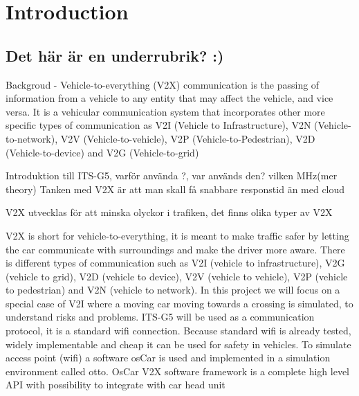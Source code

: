 \section{Introduction}
\subsection{Det här är en underrubrik? :)}
Backgroud - Vehicle-to-everything (V2X) communication is the passing of information from
a vehicle to any entity that may affect the vehicle, and vice versa. It is a vehicular
communication system that incorporates other more specific types of communication as 
V2I (Vehicle to Infrastructure), V2N (Vehicle-to-network), V2V (Vehicle-to-vehicle), V2P (Vehicle-to-Pedestrian), V2D (Vehicle-to-device) and V2G (Vehicle-to-grid) 

Introduktion till ITS-G5, varför använda ?, var används den? vilken MHz(mer theory)
Tanken med V2X är att man skall få snabbare responstid än med cloud 

V2X utvecklas för att minska olyckor i trafiken, det finns olika typer av V2X\bigskip



V2X is short for vehicle-to-everything, it is meant to make traffic safer by letting the car communicate with surroundings and make the driver more aware. There is different types of communication such as V2I (vehicle to infrastructure), V2G (vehicle to grid), V2D (vehicle to device), V2V (vehicle to vehicle), V2P (vehicle to pedestrian) and V2N (vehicle to network). In this project we will focus on a special case of V2I where a moving car moving towards a crossing is simulated, to understand risks and problems. ITS-G5 will be used as a communication protocol, it is a standard wifi connection. Because standard wifi is already tested, widely implementable and cheap it can be used for safety in vehicles. To simulate access point (wifi) a software osCar is used and implemented in a simulation environment called otto. OsCar V2X software framework is a complete high level API with possibility to integrate with car head unit 
